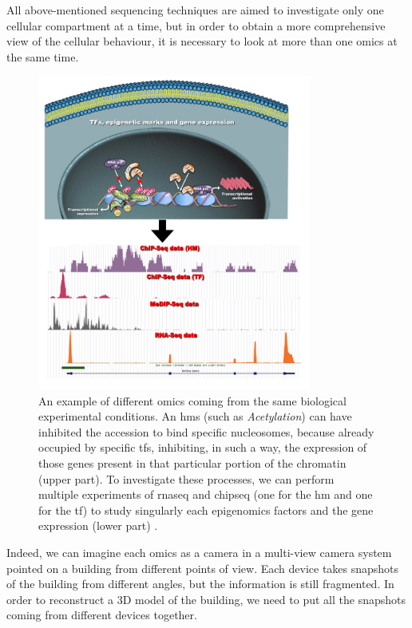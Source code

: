 All above-mentioned sequencing techniques are aimed to investigate only one cellular compartment at a time, but in order to obtain a more comprehensive view of the cellular behaviour, it is necessary to look at more than one omics at the same time.

\begin{figure}[H]
\centering
\includegraphics[width=9cm, keepaspectratio]{img/intro/multiomicsex.png}
\caption[Multi-Omics Representation]{An example of different omics coming from the same biological experimental conditions. 
An \glspl{hm} (such as \textit{Acetylation}) can have inhibited the accession to bind specific nucleosomes, because already occupied by specific \glspl{tf}, inhibiting, in such a way, the expression of those genes present in that particular portion of the chromatin (upper part).
To investigate these processes, we can perform multiple experiments of \gls{rnaseq} and \gls{chipseq} (one for the \gls{hm} and one for the \gls{tf}) to study singularly each epigenomics factors and the gene expression (lower part) \cite{Angelini2014c}.}
\label{fig:omics}
\end{figure}

Indeed, we can imagine each omics as a camera in a multi-view camera system pointed on a building from different points of view.
Each device takes snapshots of the building from different angles, but the information is still fragmented.
In order to reconstruct a 3D model of the building, we need to put all the snapshots coming from different devices together.

